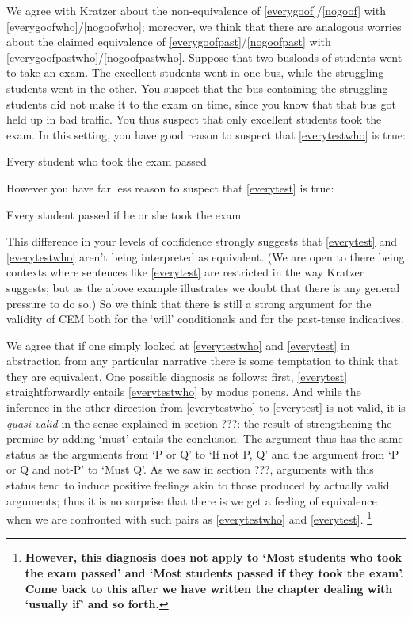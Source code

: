 \documentclass[leqno, 11pt, a5paper, openany]{article}
\begin{document}
We agree with Kratzer about the non-equivalence of \ref{everygoof}/\ref{nogoof} with \ref{everygoofwho}/\ref{nogoofwho}; moreover, we think that there are analogous worries about the claimed equivalence of \ref{everygoofpast}/\ref{nogoofpast} with \ref{everygoofpastwho}/\ref{nogoofpastwho}. Suppose that two busloads of students went to take an exam. The excellent students went in one bus, while the struggling students went in the other. You suspect that the bus containing the struggling students did not make it to the exam on time, since you know that that bus got held up in bad traffic. You thus suspect that only excellent students took the exam. In this setting, you have good reason to suspect that \ref{everytestwho} is true:
\begin{prop}
	\nitem \label{everytestwho}
	Every student who took the exam passed
	\end{prop}
	However you have far less reason to suspect that \ref{everytest} is true:
	\begin{prop}
	\nitem \label{everytest}
	Every student passed if he or she took the exam
\end{prop}
This difference in your levels of confidence strongly suggests that \ref{everytest} and \ref{everytestwho} aren't being interpreted as equivalent. (We are open to there being contexts where sentences like \ref{everytest} are restricted in the way Kratzer suggests; but as the above example illustrates we doubt that there is any general pressure to do so.) So we think that there is still a strong argument for the validity of CEM both for the ‘will’ conditionals and for the past-tense indicatives.

We agree that if one simply looked at \ref{everytestwho} and \ref{everytest} in abstraction from any particular narrative there is some temptation to think that they are equivalent. One possible diagnosis as follows: first, \ref{everytest} straightforwardly entails \ref{everytestwho} by modus ponens. And while the inference in the other direction from \ref{everytestwho} to \ref{everytest} is not valid, it is \emph{quasi-valid} in the sense explained in section ???: the result of strengthening the premise by adding ‘must’ entails the conclusion. The argument thus has the same status as the arguments from ‘P or Q’ to ‘If not P, Q’ and the argument from ‘P or Q and not-P’ to ‘Must Q’. As we saw in section ???, arguments with this status tend to induce positive feelings akin to those produced by actually valid arguments; thus it is no surprise that there is we get a feeling of equivalence when we are confronted with such pairs as \ref{everytestwho} and \ref{everytest}.%
\footnote{\textbf{However, this diagnosis does not apply to ‘Most students who took the exam passed’ and ‘Most students passed if they took the exam’. Come back to this after we have written the chapter dealing with ‘usually if’ and so forth.}}
\end{document}
